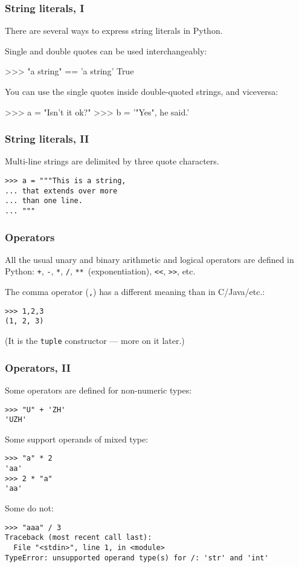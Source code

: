 \documentclass[english,serif,mathserif,xcolor=pdftex,dvipsnames,table]{beamer}
\begin{document}
\begin{frame}[fragile]
  \frametitle{String literals, I}
  There are several ways to express string literals in Python.

  \+
  Single and double quotes can be used interchangeably:
\begin{semiverbatim}
>>> "a string" == 'a string'
True
\end{semiverbatim}

  \+
  You can use the single quotes inside double-quoted strings, and viceversa:
\begin{semiverbatim}
>>> a = "Isn't it ok?"
>>> b = '"Yes", he said.'
\end{semiverbatim}
\end{frame}


\begin{frame}[fragile]
  \frametitle{String literals, II}
  Multi-line strings are delimited by three quote characters.
\begin{lstlisting}
>>> a = """This is a string,
... that extends over more
... than one line.
... """
\end{lstlisting}
\end{frame}


\begin{frame}[fragile]
  \frametitle{Operators}
  All the usual unary and binary arithmetic and logical operators are
  defined in Python: \texttt{+}, \texttt{-}, \texttt{*}, \texttt{/},
  \texttt{**}~(exponentiation), \texttt{<<}, \texttt{>>}, etc.

  \+
  The comma operator (\texttt{,}) has a different meaning than in C/Java/etc.:
\begin{lstlisting}
>>> 1,2,3
(1, 2, 3)
\end{lstlisting}
  (It is the \texttt{tuple} constructor --- more on it later.)
\end{frame}

\begin{frame}[fragile]
  \frametitle{Operators, II}
  Some operators are defined for non-numeric types:
\begin{lstlisting}
>>> "U" + 'ZH'
'UZH'
\end{lstlisting}

  \+ 
  Some support operands of mixed type:
\begin{lstlisting}
>>> "a" * 2
'aa'
>>> 2 * "a"
'aa'
\end{lstlisting}

  \+
  Some do not:
\begin{lstlisting}[basicstyle=\footnotesize\ttfamily]
>>> "aaa" / 3
Traceback (most recent call last):
  File "<stdin>", line 1, in <module>
TypeError: unsupported operand type(s) for /: 'str' and 'int'
\end{lstlisting}
\end{frame}
\end{document}
